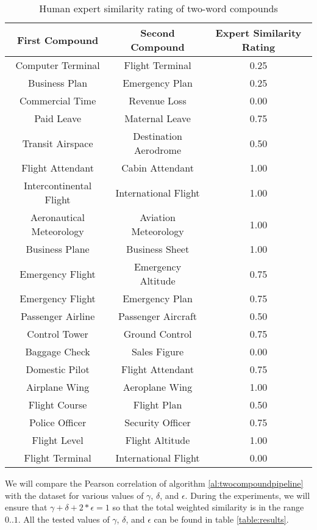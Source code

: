 \documentclass{article}
\begin{document}
\begin{table}[h!]
\centering
\begin{tabular}{|c|c||c|}
	\hline
	First Compound & Second Compound & Expert Similarity Rating \\
	\hline
	Computer Terminal & Flight Terminal & 0.25 \\
	Business Plan & Emergency Plan & 0.25 \\
	Commercial Time & Revenue Loss & 0.00 \\
	Paid Leave & Maternal Leave & 0.75 \\
	Transit Airspace & Destination Aerodrome & 0.50 \\
	Flight Attendant & Cabin Attendant & 1.00 \\
	Intercontinental Flight & International Flight & 1.00 \\
	Aeronautical Meteorology & Aviation Meteorology & 1.00 \\
	Business Plane & Business Sheet & 1.00 \\
	Emergency Flight & Emergency Altitude & 0.75 \\
	Emergency Flight & Emergency Plan & 0.75 \\
	Passenger Airline & Passenger Aircraft & 0.50 \\
	Control Tower & Ground Control & 0.75 \\
	Baggage Check & Sales Figure & 0.00 \\
	Domestic Pilot & Flight Attendant & 0.75 \\
	Airplane Wing & Aeroplane Wing & 1.00 \\
	Flight Course & Flight Plan & 0.50 \\
	Police Officer & Security Officer & 0.75 \\
	Flight Level & Flight Altitude & 1.00 \\
	Flight Terminal & International Flight & 0.00 \\
	\hline
\end{tabular}
\caption{Human expert similarity rating of two-word compounds}
\label{table:humancompoundsimilarity}
\end{table}

We will compare the Pearson correlation of algorithm \ref{al:twocompoundpipeline} with the dataset for various values of $\gamma$, $\delta$, and $\epsilon$. During the experiments, we will ensure that $\gamma + \delta + 2 * \epsilon = 1$ so that the total weighted similarity is in the range $0..1$. All the tested values of $\gamma$, $\delta$, and $\epsilon$ can be found in table \ref{table:results}.
\end{document}
